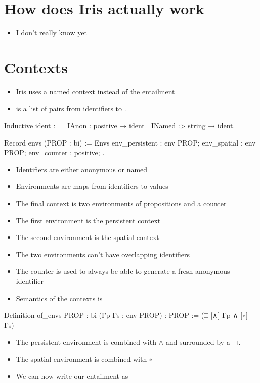 \documentclass[thesis.tex]{subfiles}
\begin{document}
\section{How does Iris actually work}
\begin{itemize}
  \item I don't really know yet
\end{itemize}

\section{Contexts}
\begin{itemize}
  \item Iris uses a named context instead of the entailment
  \item {} is a list of pairs from identifiers to .
\end{itemize}
\begin{coqcode}
  Inductive ident :=
    | IAnon : positive → ident
    | INamed :> string → ident.

  Record envs (PROP : bi) := Envs {
    env_persistent : env PROP;
    env_spatial : env PROP;
    env_counter : positive;
  }.
\end{coqcode}
\begin{itemize}
  \item Identifiers are either anonymous or named
  \item Environments are maps from identifiers to values
  \item The final context is two environments of propositions and a counter
  \item The first environment is the persistent context
  \item The second environment is the spatial context
  \item The two environments can't have overlapping identifiers
  \item The counter is used to always be able to generate a fresh anonymous identifier
  \item Semantics of the contexts is
\end{itemize}
\begin{coqcode}
  Definition of_envs {PROP : bi} 
      (Γp Γs : env PROP) : PROP :=
    (□ [∧] Γp ∧ [∗] Γs)%
\end{coqcode}
\begin{itemize}
  \item The persistent environment is combined with $\land$ and surrounded by a $\mathop{\boxempty}$.
  \item The spatial environment is combined with ∗
  \item We can now write our entailment as
\end{itemize}
\end{document}
